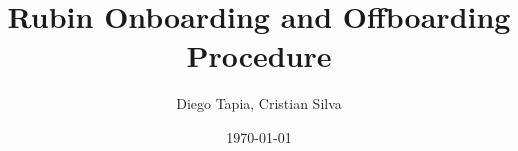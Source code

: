 \documentclass[PMO,authoryear,toc]{lsstdoc}
\title{Rubin Onboarding and Offboarding Procedure}
\author{%
Diego Tapia, Cristian Silva
}
\date {\today}
\begin{document}
\maketitle



\appendix
\renewcommand{\refname}{} %


%
\end{document}
